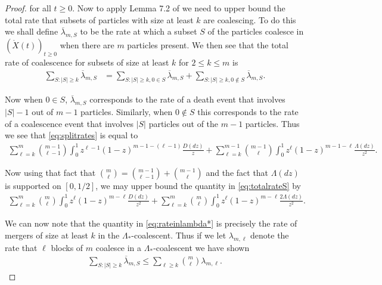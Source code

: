 \documentclass[11pt]{article}
\theoremstyle{definition}
\begin{document}
\begin{proof}
    \noindent for all $t \geq 0$. Now to apply Lemma 7.2 of \cite{Angel2012} we need to upper bound the total rate that subsets of particles with size at least $k$ are coalescing. To do this we shall define $\overline{\lambda}_{m,S}$ to be the rate at which a subset $S$ of the particles coalesce in $(\mathring{X}(t))_{t \geq 0}$ when there are $m$ particles present. We then see that the total rate of coalescence for subsets of size at least $k$ for $2 \leq k \leq m$ is
    \begin{align}\label{eq:splitrates}
        \sum_{S \colon |S| \geq k} \overline{\lambda}_{m,S} &= \sum_{S \colon |S| \geq k, 0 \in S} \overline{\lambda}_{m,S} + \sum_{S \colon |S| \geq k, 0 \notin S} \overline{\lambda}_{m,S}.
    \end{align}

    \noindent Now when $0 \in S$, $\overline{\lambda}_{m,S}$ corresponds to the rate of a death event that involves $|S|-1$ out of $m-1$ particles. Similarly, when $0 \notin S$ this corresponds to the rate of a coalescence event that involves $|S|$ particles out of the $m-1$ particles. Thus we see that \eqref{eq:splitrates} is equal to
    \begin{align}\label{eq:totalrateS}
        \sum_{\ell = k}^m \binom{m-1}{\ell - 1}\int_0^1 z^{\ell - 1}(1-z)^{m-1 - (\ell - 1)}\frac{D(dz)}{z} + \sum_{\ell = k}^{m-1} \binom{m-1}{\ell}\int_0^1 z^{\ell}(1-z)^{m-1 -\ell}\frac{\Lambda(dz)}{z^2}.
    \end{align}

    \noindent Now using that fact that $\binom{m}{\ell} =\binom{m-1}{\ell - 1} + \binom{m-1}{\ell}$ and the fact that $\Lambda(dz)$ is supported on $[0,1/2]$, we may upper bound the quantity in \eqref{eq:totalrateS} by
    \begin{align}\label{eq:rateinlambda*}
        \sum_{\ell = k}^m \binom{m}{\ell}\int_0^1 z^{\ell}(1-z)^{m- \ell}\frac{D(dz)}{z^2} + \sum_{\ell = k}^{m} \binom{m}{\ell}\int_0^1 z^{\ell}(1-z)^{m -\ell}\frac{2\Lambda(dz)}{z^2}.
    \end{align}

    \noindent We can now note that the quantity in \eqref{eq:rateinlambda*} is precisely the rate of mergers of size at least $k$ in the $\Lambda_*$-coalescent. Thus if we let $\lambda_{m, \ell}$ denote the rate that $\ell$ blocks of $m$ coalesce in a $\Lambda_*$-coalescent we have shown
    \begin{align*}
        \sum_{S \colon |S| \geq k} \overline{\lambda}_{m,S} \leq \sum_{\ell\geq k} \binom{m}{\ell}\lambda_{m,\ell}.
    \end{align*}


\end{proof}
\end{document}
